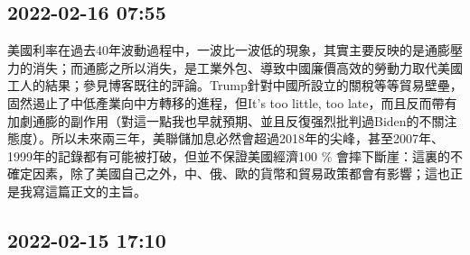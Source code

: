 \documentclass[twocolumn]{ctexart}
\begin{document}
\subsection*{2022-02-16 07:55}

美國利率在過去40年波動過程中，一波比一波低的現象，其實主要反映的是通膨壓力的消失；而通膨之所以消失，是工業外包、導致中國廉價高效的勞動力取代美國工人的結果；參見博客既往的評論。Trump針對中國所設立的關稅等等貿易壁壘，固然遏止了中低產業向中方轉移的進程，但It's too little, too late，而且反而帶有加劇通膨的副作用（對這一點我也早就預期、並且反復强烈批判過Biden的不關注態度）。所以未來兩三年，美聯儲加息必然會超過2018年的尖峰，甚至2007年、1999年的記錄都有可能被打破，但並不保證美國經濟100 \% 會摔下斷崖：這裏的不確定因素，除了美國自己之外，中、俄、歐的貨幣和貿易政策都會有影響；這也正是我寫這篇正文的主旨。
\subsection*{2022-02-15 17:10}
\end{document}
